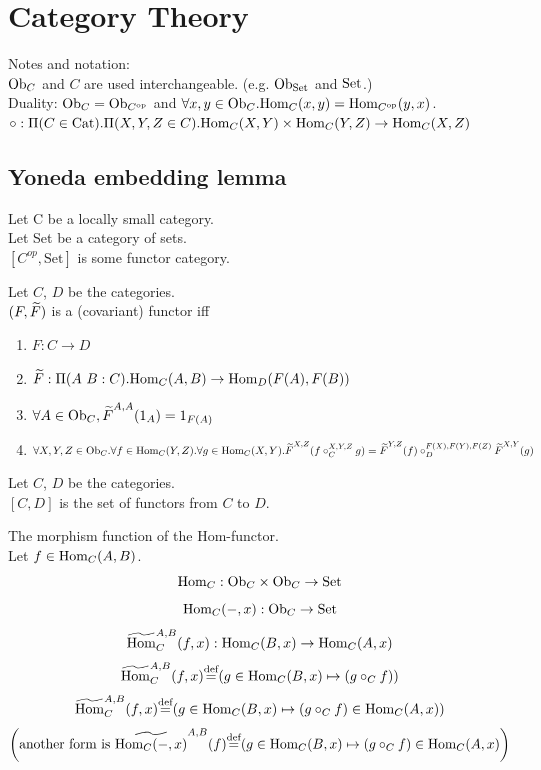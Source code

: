 \documentclass[10pt,a4paper]{article}
\begin{document}
\section{Category Theory}
Notes and notation:\\
${\textrm{Ob}}_C$ and $C$ are used interchangeable. (e.g. ${\textrm{Ob}}_{\textrm{Set}}$ and ${\textrm{Set}}$.)\\
Duality: ${\textrm{Ob}}_C = {\textrm{Ob}}_{C^{\textrm{op}}}$ and 
 $\forall x,y \in {\textrm{Ob}}_C. {\textrm{Hom}}_C(x,y) = {\textrm{Hom}}_{C^{\textrm{op}}}(y,x)$.\\
$\circ : \Pi(C\in {\textrm{Cat}}).\Pi(X,Y,Z\in C).{\textrm{Hom}}_C(X,Y)\times{\textrm{Hom}}_C(Y,Z)\to{\textrm{Hom}}_C(X,Z)$

\subsection{Yoneda embedding lemma}
Let C be a locally small category.\\
Let Set be a category of sets.\\
$[C^{op},\textrm{Set}]$ is some functor category.\\

\begin{definition}
Let $C$, $D$ be the categories.\\
 $(F, {\widetilde{F}\textrm{}})$ is a (covariant) functor iff\\
\begin{enumerate}
\item $F:C \to D$
\item ${\widetilde{F}\textrm{}}:\Pi(A\ B:C).{\textrm{Hom}}_C(A,B) \to {\textrm{Hom}}_D(F(A), F(B))$
\item $\forall A\in {\textrm{Ob}}_C, {\widetilde{F}\textrm{}}^{A,A}(1_A)=1_{F(A)}$
\item $\forall X,Y,Z \in {\textrm{Ob}}_C.\forall f\in{\textrm{Hom}}_C(Y,Z).\forall g\in{\textrm{Hom}}_C(X,Y). {\widetilde{F}\textrm{}}^{X,Z}(f\circ_C^{X,Y,Z} g)={\widetilde{F}\textrm{}}^{Y,Z}(f)\circ_D^{F(X),F(Y),F(Z)} {\widetilde{F}\textrm{}}^{X,Y}(g)$
\end{enumerate}

\end{definition}

\begin{definition}
Let $C$, $D$ be the categories.\\
$[C,D]$ is the set of functors from $C$ to $D$.\\
\end{definition}

\begin{definition} The morphism function of the Hom-functor.\\
Let $f\in{\textrm{Hom}}_{C}(A,B)$.
$${\textrm{Hom}}_C: {\textrm{Ob}}_C \times {\textrm{Ob}}_C \to {\textrm{Set}}$$
$${\textrm{Hom}}_C(-,x): {\textrm{Ob}}_C \to {\textrm{Set}}$$
$${\widetilde{{\textrm{Hom}}}\textrm{}}^{A,B}_C(f,x) : {\textrm{Hom}}_C(B,x) \to {\textrm{Hom}}_C(A,x)$$
$${\widetilde{{\textrm{Hom}}}\textrm{}}^{A,B}_C(f,x) {\stackrel{{\textrm{def}}}{=}} (g \in{\textrm{Hom}}_C(B,x) \mapsto (g \circ_C f))$$
$${\widetilde{{\textrm{Hom}}}\textrm{}}^{A,B}_C(f,x) {\stackrel{{\textrm{def}}}{=}} (g \in{\textrm{Hom}}_C(B,x) \mapsto (g \circ_C f) \in{\textrm{Hom}}_C(A,x))$$
$$\left(\textrm{another form is }\widetilde{{\textrm{Hom}}_C(-,x)}^{A,B}(f) {\stackrel{{\textrm{def}}}{=}} (g \in{\textrm{Hom}}_C(B,x) \mapsto (g \circ_C f) \in{\textrm{Hom}}_C(A,x)\right)$$
\end{definition}
\end{document}
